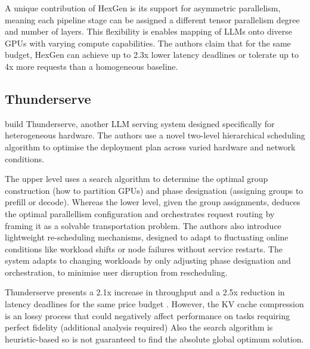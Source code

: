 
A unique contribution of HexGen is its support for asymmetric parallelism, meaning each pipeline stage can be assigned a different tensor parallelism degree and number of layers.
This flexibility is enables mapping of LLMs onto diverse GPUs with varying compute capabilities.
The authors claim that for the same budget, HexGen can achieve up to 2.3x lower latency deadlines or tolerate up to 4x more requests than a homogeneous baseline.


\subsection{Thunderserve}
\textcite{jiangThunderServeHighperformanceCostefficient2025} build Thunderserve, another LLM serving system designed specifically for heterogeneous hardware. 
The authors use a novel two-level hierarchical scheduling algorithm to optimise the deployment plan across varied hardware and network conditions.

The upper level uses a search algorithm to determine the optimal group construction (how to partition GPUs) and phase designation (assigning groups to prefill or decode).
Whereas the lower level, given the group assignments, deduces the optimal parallellism configuration and orchestrates request routing by framing it as a solvable transportation problem.
The authors also introduce lightweight re-scheduling mechanisms, designed to adapt to fluctuating online conditions like workload shifts or node failures without service restarts.
The system adapts to changing workloads by only adjusting phase designation and orchestration, to minimise user disruption from rescheduling.


Thunderserve presents a 2.1x increase in throughput and a 2.5x reduction in latency deadlines for the same price budget \autocite{jiangThunderServeHighperformanceCostefficient2025}.
However, the KV cache compression is an lossy process that could negatively affect performance on tasks requiring perfect fidelity (additional analysis required)
Also the search algorithm is heuristic-based so is not guaranteed to find the absolute global optimum solution.
 
